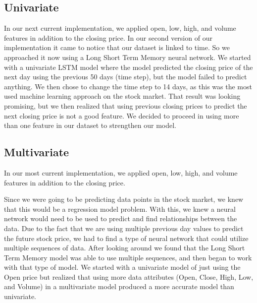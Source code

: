 \documentclass{article}
\begin{document}
\subsection{Univariate}
In our next current implementation, we applied open, low, high, and volume features in addition to the closing price.
In our second version of our implementation it came to notice that our dataset is linked to time. So we approached it now using a Long Short Term Memory neural network. We started with a univariate LSTM model where the model predicted the closing price of the next day using the previous 50 days (time step), but the model failed to predict anything. We then chose to change the time step to 14 days, as this was the most used machine learning approach on the stock market. That result was looking promising, but we then realized that using previous closing prices to predict the next closing price is not a good feature. We decided to proceed in using more than one feature in our dataset to strengthen our model. 

\subsection{Multivariate}
In our most current implementation, we applied open, low, high, and volume features in addition to the closing price.

Since we were going to be predicting data points in the stock market, we knew that this would be a regression model problem. With this, we knew a neural network would need to be used to predict and find relationships between the data. Due to the fact that we are using multiple previous day values to predict the future stock price, we had to find a type of neural network that could utilize multiple sequences of data. After looking around we found that the Long Short Term Memory model was able to use multiple sequences, and then began to work with that type of model. We started with a univariate model of just using the Open price but realized that using more data attributes (Open, Close, High, Low, and Volume) in a multivariate model produced a more accurate model than univariate.

\end{document}
